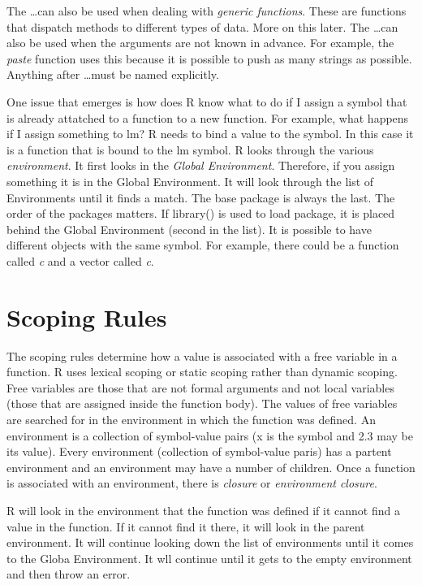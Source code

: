 \documentclass{article}\usepackage{graphicx, color}
\begin{document}
The \dots can also be used when dealing with \emph{generic functions}.  These are functions that dispatch methods to different types of data.  More on this later.  The \dots can also be used when the arguments are not known in advance. For example, the \emph{paste} function uses this because it is possible to push as many strings as possible.  Anything after \dots must be named explicitly. 

One issue that emerges is how does R know what to do if I assign a symbol that is already attatched to a function to a new function.  For example, what happens if I assign something to lm?  R needs to bind a value to the symbol.  In this case it is a function that is bound to the lm symbol. R looks through the various \emph{environment}.  It first looks in the \emph{Global Environment}. Therefore, if you assign something it is in the Global Environment.  It will look through the list of Environments until it finds a match.  The base package is always the last.  The order of the packages matters.  If library() is used to load package, it is placed behind the Global Environment (second in the list).  It is possible to have different objects with the same symbol.  For example, there could be a function called \emph{c} and a vector called \emph{c}. 

\section{Scoping Rules}
The scoping rules determine how a value is associated with a free variable in a function.  R uses lexical scoping or static scoping rather than dynamic scoping. Free variables are those that are not formal arguments and not local variables (those that are assigned inside the function body).  The values of free variables are searched for in the environment in which the function was defined. An environment is a collection of symbol-value pairs (x is the symbol and 2.3 may be its value).  Every environment (collection of symbol-value paris) has a partent environment and an environment may have a number of children. Once a function is associated with an environment, there is \emph{closure} or \emph{environment closure}.  

R will look in the environment that the function was defined if it cannot find a value in the function.  If it cannot find it there, it will look in the parent environment.  It will continue looking down the list of environments until it comes to the Globa Environment. It wll continue until it gets to the empty
environment and then throw an error. 
\end{document}
